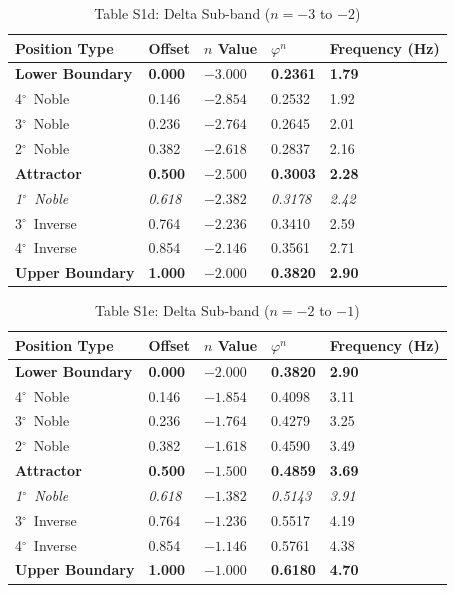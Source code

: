 \documentclass[11pt,a4paper]{article}
\newcommand{\degree}{$^\circ$}  %
\newcommand{\phisym}{\varphi}
\begin{document}
\begin{table}[H]
\centering
\caption*{Table S1d: Delta Sub-band ($n = -3$ to $-2$)}
\begin{tabular}{@{}lllll@{}}
\toprule
Position Type & Offset & $n$ Value & $\phisym^n$ & Frequency (Hz) \\
\midrule
\textbf{Lower Boundary} & \textbf{0.000} & $\mathbf{-3.000}$ & \textbf{0.2361} & \textbf{1.79} \\
4\degree\ Noble & 0.146 & $-2.854$ & 0.2532 & 1.92 \\
3\degree\ Noble & 0.236 & $-2.764$ & 0.2645 & 2.01 \\
2\degree\ Noble & 0.382 & $-2.618$ & 0.2837 & 2.16 \\
\textbf{Attractor} & \textbf{0.500} & $\mathbf{-2.500}$ & \textbf{0.3003} & \textbf{2.28} \\
\textit{1\degree\ Noble} & \textit{0.618} & $-2.382$ & \textit{0.3178} & \textit{2.42} \\
3\degree\ Inverse & 0.764 & $-2.236$ & 0.3410 & 2.59 \\
4\degree\ Inverse & 0.854 & $-2.146$ & 0.3561 & 2.71 \\
\textbf{Upper Boundary} & \textbf{1.000} & $\mathbf{-2.000}$ & \textbf{0.3820} & \textbf{2.90} \\
\bottomrule
\end{tabular}
\end{table}

\begin{table}[H]
\centering
\caption*{Table S1e: Delta Sub-band ($n = -2$ to $-1$)}
\begin{tabular}{@{}lllll@{}}
\toprule
Position Type & Offset & $n$ Value & $\phisym^n$ & Frequency (Hz) \\
\midrule
\textbf{Lower Boundary} & \textbf{0.000} & $\mathbf{-2.000}$ & \textbf{0.3820} & \textbf{2.90} \\
4\degree\ Noble & 0.146 & $-1.854$ & 0.4098 & 3.11 \\
3\degree\ Noble & 0.236 & $-1.764$ & 0.4279 & 3.25 \\
2\degree\ Noble & 0.382 & $-1.618$ & 0.4590 & 3.49 \\
\textbf{Attractor} & \textbf{0.500} & $\mathbf{-1.500}$ & \textbf{0.4859} & \textbf{3.69} \\
\textit{1\degree\ Noble} & \textit{0.618} & $-1.382$ & \textit{0.5143} & \textit{3.91} \\
3\degree\ Inverse & 0.764 & $-1.236$ & 0.5517 & 4.19 \\
4\degree\ Inverse & 0.854 & $-1.146$ & 0.5761 & 4.38 \\
\textbf{Upper Boundary} & \textbf{1.000} & $\mathbf{-1.000}$ & \textbf{0.6180} & \textbf{4.70} \\
\bottomrule
\end{tabular}
\end{table}
\end{document}
